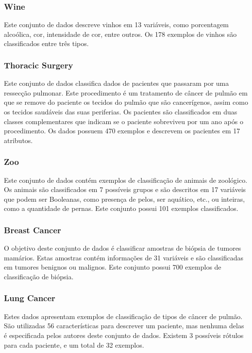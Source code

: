 \subsubsection{Wine}
Este conjunto de dados descreve vinhos em 13 variáveis, como porcentagem 
alcoólica, cor, intensidade de cor, entre outros. Os 178 exemplos de
vinhos são classificados entre três tipos.

\subsubsection{Thoracic Surgery}
Este conjunto de dados classifica dados de pacientes que passaram por
uma ressecção pulmonar. Este procedimento é um tratamento de câncer
de pulmão em que se remove do paciente os tecidos do pulmão que são 
cancerígenos, assim como os tecidos saudáveis das suas periferias.
Os pacientes são classificados em duas classes complementares que 
indicam se o paciente sobreviveu por um ano após o procedimento.
Os dados possuem 470 exemplos e descrevem os pacientes em 17 atributos.

\subsubsection{Zoo}
Este conjunto de dados contém exemplos de classificação de animais de
zoológico. Os animais são classificados em 7 possíveis grupos e são 
descritos em 17 variáveis que podem ser Booleanas, como presença de 
pelos, ser aquático, etc., ou inteiras, como a quantidade de pernas. 
Este conjunto possui 101 exemplos classificados.

\subsubsection{Breast Cancer}
O objetivo deste conjunto de dados é classificar amostras de biópsia
de tumores mamários. Estas amostras contém informações de 31 variáveis
e são classificadas em tumores benignos ou malignos. Este conjunto 
possui 700 exemplos de classificação de biópsia.

\subsubsection{Lung Cancer}
Estes dados apresentam exemplos de classificação de tipos de câncer
de pulmão. São utilizadas 56 características para descrever um paciente,
mas nenhuma delas é especificada pelos autores deste conjunto de dados.
Existem 3 possíveis rótulos para cada paciente, e um total de 32 
exemplos.


